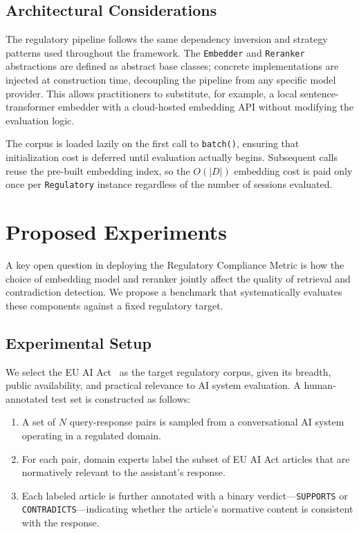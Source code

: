 \documentclass[11pt]{article}
\begin{document}
\subsection{Architectural Considerations}

The regulatory pipeline follows the same dependency inversion and strategy patterns used throughout the framework. The \texttt{Embedder} and \texttt{Reranker} abstractions are defined as abstract base classes; concrete implementations are injected at construction time, decoupling the pipeline from any specific model provider. This allows practitioners to substitute, for example, a local sentence-transformer embedder with a cloud-hosted embedding API without modifying the evaluation logic.

The corpus is loaded lazily on the first call to \texttt{batch()}, ensuring that initialization cost is deferred until evaluation actually begins. Subsequent calls reuse the pre-built embedding index, so the $O(|D|)$ embedding cost is paid only once per \texttt{Regulatory} instance regardless of the number of sessions evaluated.

\section{Proposed Experiments}

A key open question in deploying the Regulatory Compliance Metric is how the choice of embedding model and reranker jointly affect the quality of retrieval and contradiction detection. We propose a benchmark that systematically evaluates these components against a fixed regulatory target.

\subsection{Experimental Setup}

We select the EU AI Act~\cite{euaiact2024} as the target regulatory corpus, given its breadth, public availability, and practical relevance to AI system evaluation. A human-annotated test set is constructed as follows:

\begin{enumerate}
    \item A set of $N$ query-response pairs is sampled from a conversational AI system operating in a regulated domain.
    \item For each pair, domain experts label the subset of EU AI Act articles that are normatively relevant to the assistant's response.
    \item Each labeled article is further annotated with a binary verdict---\texttt{SUPPORTS} or \texttt{CONTRADICTS}---indicating whether the article's normative content is consistent with the response.
\end{enumerate}
\end{document}
